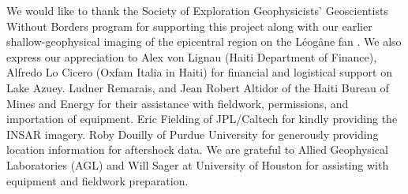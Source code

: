 \documentclass[linenumbers,draft]{agujournal}
\begin{document}
\acknowledgments
We would like to thank the Society of Exploration Geophysicists' Geoscientists Without Borders program for supporting this project along with our earlier shallow-geophysical imaging of the epicentral region on the L\'eog\^ane fan \citep{kocel2016near}. We also express our appreciation to Alex von Lignau (Haiti Department of Finance), Alfredo Lo Cicero (Oxfam Italia in Haiti) for financial and logistical support on Lake Azuey. Ludner Remarais, and Jean Robert Altidor of the Haiti Bureau of Mines and Energy for their assistance with fieldwork, permissions, and importation of equipment. Eric Fielding of JPL/Caltech for kindly providing the INSAR imagery. Roby Douilly of Purdue University for generously providing location information for aftershock data. We are grateful to Allied Geophysical Laboratories (AGL) and Will Sager at University of Houston for assisting with equipment and fieldwork preparation.

\clearpage


\end{document}
